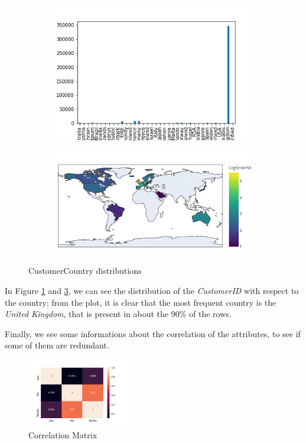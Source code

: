 \begin{figure}[!h]
\begin{subfigure}{.49\textwidth}
\centering
\includegraphics[width=.93\textwidth]{img/understanding/orders_country_bar.png}
\caption{}
\label{fig:orders_country_bar}
\end{subfigure}
\begin{subfigure}{.49\textwidth}
\centering
\includegraphics[width=.93\textwidth]{img/understanding/orders_country.png}
\caption{}
\label{fig:orders_country}
\end{subfigure}
\caption{CustomerCountry distributions}
\end{figure}

In Figure \ref{fig:orders_country_bar} and \ref{fig:orders_country}, we can see the distribution of the \emph{CustomerID} with respect to the country; from the plot, it is clear that the most frequent country is the \emph{United Kingdom}, that is present in about the 90\% of the rows.

Finally, we see some informations about the correlation of the attributes, to see if some of them are redundant.\\
\begin{figure}
\centering
\includegraphics[width=0.4\textwidth]{img/understanding/dataset_corr.png}
\caption{Correlation Matrix}
\label{fig:dataset_corr}
\end{figure}

